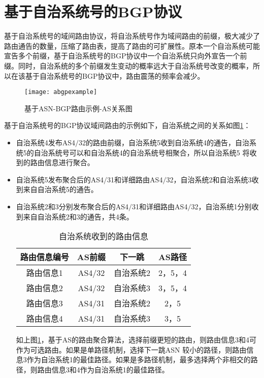 \section{基于自治系统号的BGP协议}

基于自治系统号的域间路由协议，将自治系统号作为域间路由的前缀，极大减少了路由通告的数量，压缩了路由表，提高了路由的可扩展性。原本一个自治系统可能宣告多个前缀，基于自治系统号的BGP协议中一个自治系统只向外宣告一个前缀。同时，自治系统的多个前缀发生变动的概率远大于自治系统号改变的概率，所以在该基于自治系统号的BGP协议中，路由震荡的频率会减少。

\begin{figure}
  \centering
  \texttt{[image: abgpexample]}
  \caption{基于ASN-BGP路由示例-AS关系图}
  \label{fig:abgpexample}
\end{figure}


基于自治系统号的BGP协议域间路由的示例如下，自治系统之间的关系如图\ref{fig:abgpexample}：

\begin{itemize}
\item 自治系统4发布AS4$/$32的路由前缀，自治系统5收到自治系统4的通告，自治系统5的自治系统号可以和自治系统4的自治系统号相聚合，所以自治系统5 将收到的路由信息进行聚合。
\item 自治系统5发布聚合后的AS4$/$31和详细路由AS4$/$32，自治系统2和自治系统3收到来自自治系统5的通告。
\item 自治系统2和3分别发布聚合后的AS4$/$31和详细路由AS4$/$32，自治系统1分别收到来自自治系统2和3的通告，共4条。

\begin{table}[h]
    \centering
    \caption{自治系统收到的路由信息}
    \label{tab:oneroutinginfo}
        \begin{tabular}{|c|c|c|c|}
        \hline
            路由信息编号 & AS前缀 & 下一跳 & AS路径\\ \hline
            路由信息1 & AS4$/$32 & 自治系统2 & 2，5，4\\ \hline
            路由信息2 & AS4$/$32 & 自治系统3 & 3，5，4\\ \hline
            路由信息3 & AS4$/$31 & 自治系统2 & 2，5\\ \hline
            路由信息4 & AS4$/$31 & 自治系统3 & 3，5\\
        \hline
        \end{tabular}
\end{table}
    如上图\ref{tab:oneroutinginfo}，基于AS的路由聚合算法，选择前缀更短的路由，则路由信息3和4可作为可选路由。如果是单路径机制，选择下一跳ASN 较小的路径，则路由信息3作为自治系统1的最佳路径。如果是多路径机制，最多选择两个非相交的路径，则路由信息3和4作为自治系统1的最佳路径。
    
\end{itemize}


